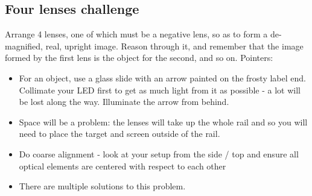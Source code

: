 \documentclass[a4paper]{report}
\begin{document}
    \subsection{Four lenses challenge}
	Arrange 4 lenses, one of which must be a negative lens, so as to form a de-magnified, real, upright image. Reason through it, and remember that the image formed by the first lens is the object for the second, and so on. Pointers: 
	\begin{itemize}
    	\item For an object, use a glass slide with an arrow painted on the frosty label end. Collimate your LED first to get as much light from it as possible - a lot will be lost along the way. Illuminate the arrow from behind.
		\item Space will be a problem: the lenses will take up the whole rail and so you will need to place the target and screen outside of the rail.
		\item Do coarse alignment - look at your setup from the side / top and ensure all optical elements are centered with respect to each other
		\item There are multiple solutions to this problem.
	\end{itemize}
	
\end{document}
